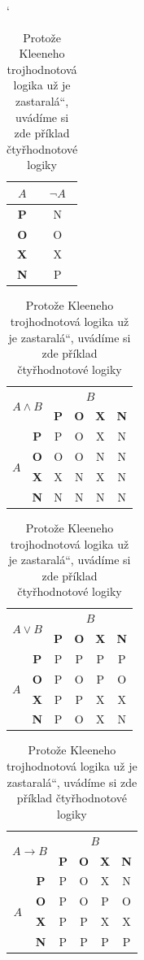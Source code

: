 \documentclass[11pt, a4paper, titlepage] {article}
\newcommand{\myuv}[1]{\quotedblbase #1\textquotedblleft}
\begin{document}
\begin{table}[h]
\begin{center}
\catcode` %
\begin{tabular}{|c|c|}
	\hline
	$A$ & $\neg A$\\ \hline
	\textbf{P} & N\\ \hline
	\textbf{O} & O\\ \hline
	\textbf{X} & X\\ \hline
	\textbf{N} & P\\ \hline
\end{tabular}
\begin{tabular}{|c|c|c|c|c|c|}
	\hline
	\multicolumn{2}{|c|}{\multirow{2}{*}{$A\wedge B$}} & \multicolumn{4}{c|}{$B$}\\ \cline{3-6}
    \multicolumn{2}{|c|}{} &\textbf{P} & \textbf{O} & \textbf{X}& \textbf{N} \\ \hline
    \multirow{4}{*}{$A$} & \textbf{P} & P & O & X & N \\ \cline{2-6}
    & \textbf{O} & O & O & N & N \\ \cline{2-6}
    & \textbf{X} & X & N & X & N \\ \cline{2-6}
    & \textbf{N} & N & N & N & N \\ \hline
\end{tabular}
\begin{tabular}{|c|c|c|c|c|c|}
	\hline
	\multicolumn{2}{|c|}{\multirow{2}{*}{$A\vee B$}} & \multicolumn{4}{c|}{$B$}\\ \cline{3-6}
    \multicolumn{2}{|c|}{} &\textbf{P} & \textbf{O} & \textbf{X}& \textbf{N} \\ \hline
    \multirow{4}{*}{$A$} & \textbf{P} & P & P & P & P \\ \cline{2-6}
    & \textbf{O} & P & O & P & O \\ \cline{2-6}
    & \textbf{X} & P & P & X & X \\ \cline{2-6}
    & \textbf{N} & P & O & X & N \\ \hline
\end{tabular}
\begin{tabular}{|c|c|c|c|c|c|}
	\hline
	\multicolumn{2}{|c|}{\multirow{2}{*}{$A\rightarrow B$}} & \multicolumn{4}{c|}{$B$}\\ \cline{3-6}
    \multicolumn{2}{|c|}{} &\textbf{P} & \textbf{O} & \textbf{X}& \textbf{N} \\ \hline
    \multirow{4}{*}{$A$} & \textbf{P} & P & O & X & N \\ \cline{2-6}
    & \textbf{O} & P & O & P & O \\ \cline{2-6}
    & \textbf{X} & P & P & X & X \\ \cline{2-6}
    & \textbf{N} & P & P & P & P \\ \hline
\end{tabular}
\caption{Protože Kleeneho trojhodnotová logika už je
\label{tabulky} \myuv{zastaralá}, uvádíme si zde příklad čtyřhodnotové logiky}
\end{center}
\end{table}
\end{document}
